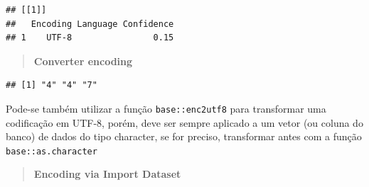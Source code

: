 \documentclass[
]{book}
\newenvironment{Shaded}{\begin{snugshade}}{\end{snugshade}}
\newcommand{\AttributeTok}[1]{\textcolor[rgb]{0.77,0.63,0.00}{#1}}
\newcommand{\CommentTok}[1]{\textcolor[rgb]{0.56,0.35,0.01}{\textit{#1}}}
\newcommand{\DecValTok}[1]{\textcolor[rgb]{0.00,0.00,0.81}{#1}}
\newcommand{\FunctionTok}[1]{\textcolor[rgb]{0.00,0.00,0.00}{#1}}
\newcommand{\NormalTok}[1]{#1}
\newcommand{\OtherTok}[1]{\textcolor[rgb]{0.56,0.35,0.01}{#1}}
\newcommand{\SpecialCharTok}[1]{\textcolor[rgb]{0.00,0.00,0.00}{#1}}
\newcommand{\StringTok}[1]{\textcolor[rgb]{0.31,0.60,0.02}{#1}}
\theoremstyle{definition}
\theoremstyle{definition}
\theoremstyle{definition}
\theoremstyle{definition}
\theoremstyle{remark}
\begin{document}
\begin{verbatim}
## [[1]]
##   Encoding Language Confidence
## 1    UTF-8                0.15
\end{verbatim}

\begin{quote}
\textbf{Converter encoding}
\end{quote}

\begin{Shaded}
\end{Shaded}

\begin{verbatim}
## [1] "4" "4" "7"
\end{verbatim}

Pode-se também utilizar a função \texttt{base::enc2utf8} para transformar uma codificação em UTF-8, porém, deve ser sempre aplicado a um vetor (ou coluna do banco) de dados do tipo character, se for preciso, transformar antes com a função \texttt{base::as.character}

\begin{Shaded}
\end{Shaded}

\begin{quote}
\textbf{Encoding via Import Dataset}
\end{quote}
\end{document}
